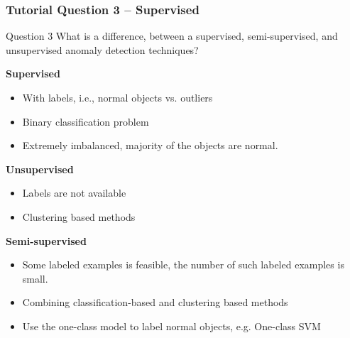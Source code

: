 \documentclass[aspectratio=169, 10pt]{beamer}
\begin{document}
\begin{frame}
    \frametitle{Tutorial Question 3 -- Supervised}
    \footnotesize 

    \begin{block}{Question 3}
        What is a difference, between a supervised, semi-supervised, and unsupervised anomaly detection techniques?
    \end{block}

    \textbf{Supervised}
    \begin{itemize}
        \item With labels, i.e., normal objects vs. outliers
        \item Binary classification problem
        \item Extremely imbalanced, majority of the objects are normal.
    \end{itemize}

    \textbf{Unsupervised}
    \begin{itemize}
        \item Labels are not available
        \item Clustering based methods
    \end{itemize}

    \textbf{Semi-supervised}
    \begin{itemize}
        \item Some labeled examples is feasible, the number of such labeled examples is small.
        \item Combining classification-based and clustering based methods
        \item Use the one-class model to label normal objects, e.g. One-class SVM
    \end{itemize}
\end{frame}

\end{document}

